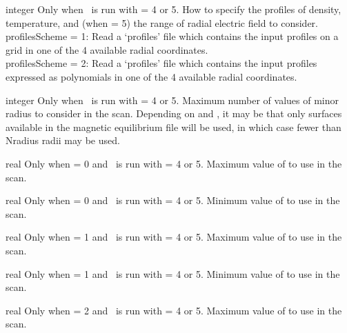 {integer}
{Only when \sfincsScan~is run with  = 4 or 5.}
{How to specify the profiles of density, temperature, and (when   = 5)
the range of radial electric field to consider.\\

{\ttfamily profilesScheme} = 1: Read a `{\ttfamily profiles}' file which contains the input profiles on a grid in one of the 4 available radial coordinates.\\

{\ttfamily profilesScheme} = 2: Read a `{\ttfamily profiles}' file which contains the input profiles expressed as polynomials in one of the 4 available radial coordinates.
}

\myhrule

{integer}
{Only when \sfincsScan~is run with  = 4 or 5.}
{Maximum number of values of minor radius to consider in the scan.
Depending on  and ,
it may be that only surfaces available in the magnetic equilibrium file will be
used, in which case fewer than {\ttfamily Nradius} radii may be used.}

\myhrule

{real}
{Only when  = 0 and \sfincsScan~is run with  = 4 or 5.}
{Maximum value of  to use in the scan.}

\myhrule

{real}
{Only when  = 0 and \sfincsScan~is run with  = 4 or 5.}
{Minimum value of  to use in the scan.}

\myhrule

{real}
{Only when  = 1 and \sfincsScan~is run with  = 4 or 5.}
{Maximum value of  to use in the scan.}

\myhrule

{real}
{Only when  = 1 and \sfincsScan~is run with  = 4 or 5.}
{Minimum value of  to use in the scan.}

\myhrule

{real}
{Only when  = 2 and \sfincsScan~is run with  = 4 or 5.}
{Maximum value of  to use in the scan.}

